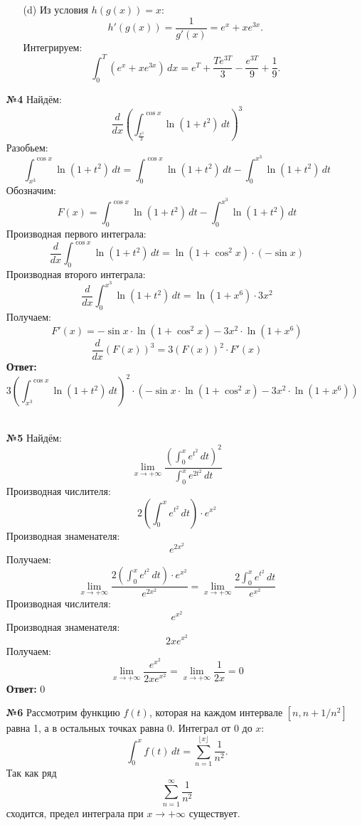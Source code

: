 \documentclass[a4paper]{article}
\begin{document}
\begin{enumerate}
\begin{enumerate}
        \item[(d)]Из условия \(h(g(x)) = x\):  
        \[
        h'(g(x)) = \frac{1}{g'(x)} = e^x + xe^{3x}.
        \]  
        Интегрируем:  
        \[
        \int_0^T (e^x + xe^{3x}) \, dx = e^T + \frac{T e^{3T}}{3} - \frac{e^{3T}}{9} + \frac{1}{9}.
        \]  

    \end{enumerate}


    \item[\textbf{№4}]Найдём:
    \[\frac{d}{dx} \left( \int_{\frac{x^3}{3}}^{\cos x} \ln(1 + t^2) \, dt \right)^3\]
    Разобьем:
    \[
    \int_{x^3}^{\cos x} \ln(1+t^2) \, dt = \int_{0}^{\cos x} \ln(1+t^2) \, dt - \int_{0}^{x^3} \ln(1+t^2) \, dt
    \]
    Обозначим:
    \[
    F(x) = \int_{0}^{\cos x} \ln(1+t^2) \, dt - \int_{0}^{x^3} \ln(1+t^2) \, dt
    \]
    Производная первого интеграла:
    \[
    \frac{d}{dx} \int_{0}^{\cos x} \ln(1+t^2) \, dt = \ln(1+\cos^2 x) \cdot (-\sin x)
    \]
    Производная второго интеграла:
    \[
    \frac{d}{dx} \int_{0}^{x^3} \ln(1+t^2) \, dt = \ln(1+x^6) \cdot 3x^2
    \]
    Получаем:
    \[
    F'(x) = -\sin x \cdot \ln(1+\cos^2 x) - 3x^2 \cdot \ln(1+x^6)
    \]
    \[
    \frac{d}{dx} \left(F(x)\right)^3 = 3 \left(F(x)\right)^2 \cdot F'(x)
    \]
    \textbf{Ответ:}
    \[
    3 \left( \int_{x^3}^{\cos x} \ln(1+t^2) \, dt \right)^2 \cdot \left( -\sin x \cdot \ln(1+\cos^2 x) - 3x^2 \cdot \ln(1+x^6) \right)
    \]\\

    \item[\textbf{№5}]Найдём:
    \[
    \lim_{x \to +\infty} \frac{\left( \int_0^x e^{t^2} \, dt \right)^2}{\int_0^x e^{2t^2} \, dt}
    \]
    Производная числителя:
    \[
    2 \left( \int_0^x e^{t^2} \, dt \right) \cdot e^{x^2}
    \]
    Производная знаменателя:
    \[
    e^{2x^2}
    \]
    Получаем:
    \[
    \lim_{x \to +\infty} \frac{2 \left( \int_0^x e^{t^2} \, dt \right) \cdot e^{x^2}}{e^{2x^2}} = \lim_{x \to +\infty} \frac{2 \int_0^x e^{t^2} \, dt}{e^{x^2}}
    \]
    Производная числителя:
    \[
    e^{x^2}
    \]
    Производная знаменателя:
    \[
    2x e^{x^2}
    \]
    Получаем:
    \[
    \lim_{x \to +\infty} \frac{e^{x^2}}{2x e^{x^2}} = \lim_{x \to +\infty} \frac{1}{2x} = 0
    \]
    \textbf{Ответ: } $0$\\

    \item[\textbf{№6}]Рассмотрим функцию \( f(t) \), которая на каждом интервале \([n, n + 1/n^2]\)  равна 1, а в остальных точках равна 0. 
    Интеграл от 0 до \( x \):  
    \[
    \int_0^x f(t) \, dt = \sum_{n=1}^{\lfloor x \rfloor} \frac{1}{n^2}.
    \]
    Так как ряд \[ \sum_{n=1}^{\infty} \frac{1}{n^2} \]
    сходится, предел интеграла при \( x \to +\infty \) существует.


\end{enumerate}
\end{document}
